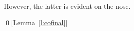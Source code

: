 \documentclass[9pt]{amsart}
\theoremstyle{remark}
\theoremstyle{definition}
\theoremstyle{remark}
\newcommand{\lemref}[1]{Lemma~\ref{#1}}
\numberwithin{equation}{section}
\begin{document}
\medskip

However, the latter is evident on the nose.

\qed[\lemref{l:cofinal}]



%
%
% 
%
% 
%
%
%
%
%
%
\end{document}
